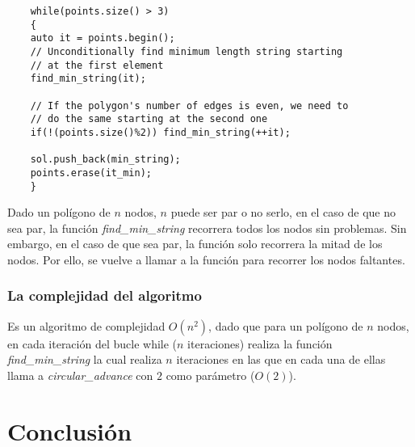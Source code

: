 \documentclass[a4paper, 11pt]{article}
\begin{document}
	\begin{lstlisting}
	while(points.size() > 3)
	{
	auto it = points.begin();
	// Unconditionally find minimum length string starting
	// at the first element
	find_min_string(it);
	
	// If the polygon's number of edges is even, we need to
	// do the same starting at the second one
	if(!(points.size()%2)) find_min_string(++it);
	
	sol.push_back(min_string);
	points.erase(it_min);
	}
	\end{lstlisting}
	
	Dado un polígono de $n$ nodos, $n$ puede ser par o no serlo, en el caso de que no sea par, la función \textit{find\_min\_string} recorrera todos los nodos sin problemas. Sin embargo, en el caso de que sea par, la función solo recorrera la mitad de los nodos.
	Por ello, se vuelve a llamar a la función para recorrer los nodos faltantes.

\subsubsection{La complejidad del algoritmo}
Es un algoritmo de complejidad $O(n^2)$, dado que para un polígono de $n$ nodos, en cada iteración del bucle while ($n$ iteraciones) realiza la función \textit{find\_min\_string} la cual realiza $n$ iteraciones en las que en cada una de ellas llama a \textit{circular\_advance} con $2$ como parámetro ($O(2)$).


\section{Conclusión}
\end{document}
